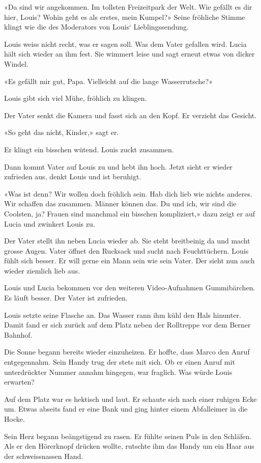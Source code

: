 «Da sind wir angekommen. Im tollsten Freizeitpark der Welt. Wie gefällt
es dir hier, Louis? Wohin geht es als erstes, mein Kumpel?» Seine
fröhliche Stimme klingt wie die des Moderators von Louis`
Lieblingssendung.

Louis weiss nicht recht, was er sagen soll. Was dem Vater gefallen wird.
Lucia hält sich wieder an ihm fest. Sie wimmert leise und sagt erneut
etwas von dicker Windel.

«Es gefällt mir gut, Papa. Vielleicht auf die lange Wasserrutsche?»

Louis gibt sich viel Mühe, fröhlich zu klingen.

Der Vater senkt die Kamera und fasst sich an den Kopf. Er verzieht das
Gesicht.

«So geht das nicht, Kinder,» sagt er.

Er klingt ein bisschen wütend. Louis zuckt zusammen.

Dann kommt Vater auf Louis zu und hebt ihn hoch. Jetzt sieht er wieder
zufrieden aus, denkt Louis und ist beruhigt.

«Was ist denn? Wir wollen doch fröhlich sein. Hab dich lieb wie nichts
anderes. Wir schaffen das zusammen. Männer können das. Du und ich, wir
sind die Coolsten, ja? Frauen sind manchmal ein bisschen kompliziert,»
dazu zeigt er auf Lucia und zwinkert Louis zu.

Der Vater stellt ihn neben Lucia wieder ab. Sie steht breitbeinig da und
macht grosse Augen. Vater öffnet den Rucksack und sucht nach
Feuchttüchern. Louis fühlt sich besser. Er will gerne ein Mann sein wie
sein Vater. Der sieht nun auch wieder ziemlich lieb aus.

Louis und Lucia bekommen vor den weiteren Video-Aufnahmen Gummibärchen.
Es läuft besser. Der Vater ist zufrieden.

Louis setzte seine Flasche an. Das Wasser rann ihm kühl den Hals
hinunter. Damit fand er sich zurück auf dem Platz neben der Rolltreppe
vor dem Berner Bahnhof.

Die Sonne begann bereits wieder einzuheizen. Er hoffte, dass Marco den
Anruf entgegennahm. Sein Handy trug der stets mit sich. Ob er einen
Anruf mit unterdrückter Nummer annahm hingegen, war fraglich. Was würde
Louis erwarten?

Auf dem Platz war es hektisch und laut. Er schaute sich nach einer
ruhigen Ecke um. Etwas abseits fand er eine Bank und ging hinter einem
Abfalleimer in die Hocke.

Sein Herz begann beängstigend zu rasen. Er fühlte seinen Puls in den
Schläfen. Als er den Hörerknopf drücken wollte, rutschte ihm das Handy
um ein Haar aus der schweissnassen Hand.

